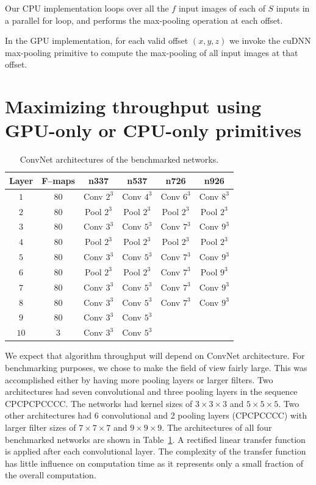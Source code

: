 \documentclass[conference]{./IEEEtran/IEEEtran}
\begin{document}
  Our CPU implementation loops over all the $f$ input images of each
  of $S$ inputs in a parallel for loop, and performs the max-pooling
  operation at each offset.

  In the GPU implementation, for each valid offset $(x,y,z)$ we invoke
  the cuDNN max-pooling primitive to compute the max-pooling of all
  input images at that offset.

\section{Maximizing throughput using GPU-only or CPU-only primitives}


  \begin{table}
    \centering
    \begin{tabular}{cccccc}
      \toprule
      Layer & F--maps & n337    & n537  &  n726  &  n926 \\
      \midrule
      $1$ & 80 &  Conv $2^3$  & Conv $4^3$  & Conv $6^3$  & Conv $8^3$ \\
      $2$ & 80 &  Pool $2^3$  & Pool $2^3$  & Pool $2^3$  & Pool $2^3$ \\
      $3$ & 80 &  Conv $3^3$  & Conv $5^3$  & Conv $7^3$  & Conv $9^3$ \\
      $4$ & 80 &  Pool $2^3$  & Pool $2^3$  & Pool $2^3$  & Pool $2^3$ \\
      $5$ & 80 &  Conv $3^3$  & Conv $5^3$  & Conv $7^3$  & Conv $9^3$ \\
      $6$ & 80 &  Pool $2^3$  & Pool $2^3$  & Conv $7^3$  & Pool $9^3$ \\
      $7$ & 80 &  Conv $3^3$  & Conv $5^3$  & Conv $7^3$  & Conv $9^3$ \\
      $8$ & 80 &  Conv $3^3$  & Conv $5^3$  & Conv $7^3$  & Conv $9^3$ \\
      $9$ & 80 & Conv $3^3$  & Conv $5^3$  & & \\
      $10$ & 3 & Conv $3^3$  & Conv $5^3$  & & \\
      \bottomrule
    \end{tabular}
    \caption{ConvNet architectures of the benchmarked networks.}
    \label{table:benchmarked_networks}
  \end{table}

  We expect that algorithm throughput will depend on ConvNet
  architecture.  For benchmarking purposes, we chose to make the field
  of view fairly large.  This was accomplished either by having more
  pooling layers or larger filters. Two architectures had seven
  convolutional and three pooling layers in the sequence CPCPCPCCCC.
  The networks had kernel sizes of $3\times 3 \times 3$ and $5\times
  5\times 5$.  Two other architectures had 6 convolutional and 2
  pooling layers (CPCPCCCC) with larger filter sizes of $7 \times
  7 \times 7$ and $9 \times 9 \times 9$.  The architectures of all
  four benchmarked networks are shown in
  Table~\ref{table:benchmarked_networks}.  A rectified linear transfer
  function is applied after each convolutional layer.  The complexity
  of the transfer function has little influence on computation
  time as it represents only a small fraction of the overall
  computation.
\end{document}

